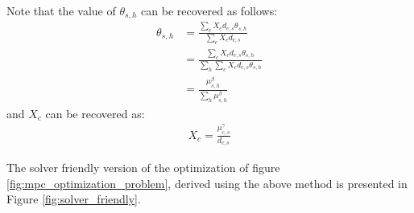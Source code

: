   Note that the value of $\theta_{s,h}$ can be recovered as follows: 
  \begin{align} \label{eq:recover-theta} 
 	\theta_{s,h}   
	& = \frac{\sum_c X_c d_{c,s} \theta_{s,h}}
	       {  \sum_c X_c d_{c,s} }  \\
	& = \frac{\sum_c X_c d_{c,s} \theta_{s,h}}
	       { \sum_h \sum_c X_c d_{c,s} \theta_{s,h} } \nonumber  \\ 
	& =   \frac{\mu_{s,h}^\beta}
		{\sum_h \mu_{s,h}^\beta }   \nonumber     
 \end{align}  
  	 and $X_{c}$ can be recovered as:  
 \begin{align} \label{eq:recover-X} 
 	X_{c} = \frac{  \mu_{c,s}^\gamma} {d_{c,s}}
 \end{align} 

  The solver friendly version of the optimization of figure \ref{fig:mpc_optimization_problem}, derived using the above method is presented in Figure \ref{fig:solver_friendly}. 
